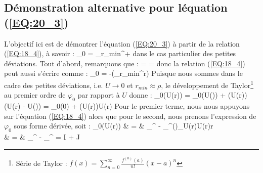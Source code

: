 \subsection{D\'emonstration alternative pour l\'equation (\ref{EQ:20_3})}

L'objectif ici est de d\'emontrer l'\'equation (\ref{EQ:20_3}) \`a partir de la relation (\ref{EQ:18_4}), \`a savoir :
\benn
	\varphi_{0} = \bigintss_{r_{min}}^{+\infty}{}
\eenn
dans le cas particulier des petites d\'eviations. Tout d'abord, remarquons que :
\benn
	 =  = 
\eenn
donc la relation (\ref{EQ:18_4}) peut aussi s'\'ecrire comme :
\benn
	\varphi_{0} = -\dfrac{\partial}{\partial \rho}\left(\bigintsss_{r_{min}}^{\infty}r\right)
\eenn
Puisque nous sommes dans le cadre des petites d\'eviations, i.e. $U \rightarrow 0$ et $r_{min} \approx \rho$, le d\'eveloppement de Taylor\footnote{S\'erie de Taylor : $f(x) = \sum_{n=0}^{\infty}\frac{f^{(n)}(a)}{n!}(x - a)^{n}$} au premier ordre de $\varphi_{0}$ par rapport \`a $U$ donne :
\benn
	\varphi_{0}(U(r)) = \varphi_{0}(U(\infty)) + (U(r))\cdot(U(r) - U(\infty))  = \varphi_{0}(0) + (U(r))\cdot U(r)
\eenn
Pour le premier terme, nous nous appuyons sur l'\'equation (\ref{EQ:18_4}) alors que pour le second, nous prenons l'expression de $\varphi_{0}$ sous forme d\'eriv\'ee, soit :
\bea
	\varphi_{0}(U(r)) & = & \bigintss_{\rho}^{\infty} - \dfrac{\partial}{\partial\rho}\bigints_{\rho}^{\infty}\left(\right)_{U(r)}\cdot U(r)r \nonumber \\
	& = & \bigintss_{\rho}^{\infty} - \bigintss_{\rho}^{\infty} = I + \dfrac{\partial}{\partial\rho}J \nonumber
\eea
